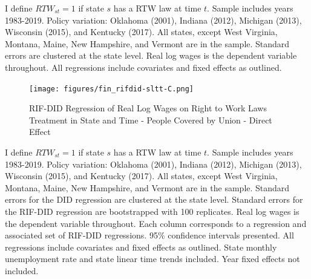 \documentclass[11pt]{article}
\begin{document}
{\pagebreak
\begin{landscape}
\small{}
\footnotesize{I define $RTW_{st} = 1$ if state $s$ has a RTW law at time $t$. Sample includes years 1983-2019. Policy variation: Oklahoma (2001), Indiana (2012), Michigan (2013), Wisconsin (2015), and Kentucky (2017). All states, except West Virginia, Montana, Maine, New Hampshire, and Vermont are in the sample. Standard errors are clustered at the state level. Real log wages is the dependent variable throughout. All regressions include covariates and fixed effects as outlined.}
\end{landscape}

\pagebreak
\begin{landscape}
\begin{figure}[ht!]
\centering
    \caption{RIF-DID Regression of Real Log Wages on Right to Work Laws Treatment in State and Time - People Covered by Union - Direct Effect}\label{fig:rifdid-sltt-C}
    \texttt{[image: figures/fin\_rifdid-sltt-C.png]}
\end{figure}
\footnotesize{I define $RTW_{st} = 1$ if state $s$ has a RTW law at time $t$. Sample includes years 1983-2019. Policy variation: Oklahoma (2001), Indiana (2012), Michigan (2013), Wisconsin (2015), and Kentucky (2017). All states, except West Virginia, Montana, Maine, New Hampshire, and Vermont are in the sample. Standard errors for the DID regression are clustered at the state level. Standard errors for the RIF-DID regression are bootstrapped with 100 replicates. Real log wages is the dependent variable throughout. Each column corresponds to a regression and associated set of RIF-DID regressions. 95\% confidence intervals presented. All regressions include covariates and fixed effects as outlined. State monthly unemployment rate and state linear time trends included. Year fixed effects not included.}
\end{landscape}

}
\end{document}
